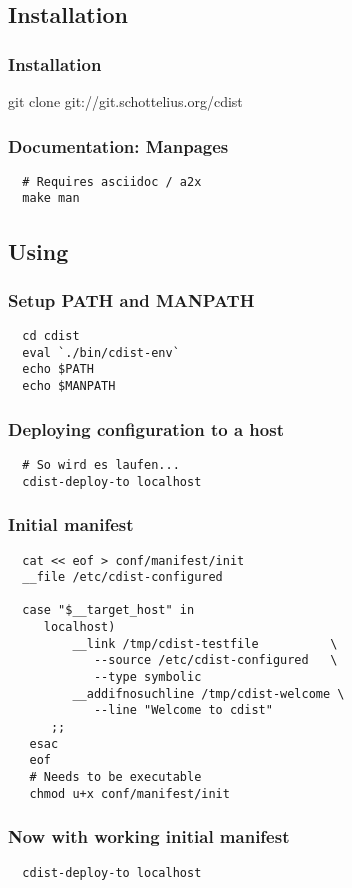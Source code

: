 \documentclass{beamer}
\begin{document}
\subsection{Installation}
\frame
{
  \frametitle{Installation}
  \begin{center}
  git clone git://git.schottelius.org/cdist
  \end{center}
}

\begin{frame}[fragile]
  \frametitle{Documentation: Manpages}

  \begin{verbatim}
  # Requires asciidoc / a2x
  make man
  \end{verbatim}
\end{frame}

\subsection{Using}
\begin{frame}[fragile]
  \frametitle{Setup PATH and MANPATH}

  \begin{verbatim}
  cd cdist
  eval `./bin/cdist-env`
  echo $PATH
  echo $MANPATH
  \end{verbatim}
\end{frame}

\begin{frame}[fragile]
  \frametitle{Deploying configuration to a host}
  \begin{verbatim}
  # So wird es laufen...
  cdist-deploy-to localhost
  \end{verbatim}
\end{frame}
\begin{frame}[fragile]
  \frametitle{Initial manifest}
  \begin{small}
  \begin{verbatim}
  cat << eof > conf/manifest/init
  __file /etc/cdist-configured

  case "$__target_host" in
     localhost)
         __link /tmp/cdist-testfile          \
            --source /etc/cdist-configured   \ 
            --type symbolic
         __addifnosuchline /tmp/cdist-welcome \
            --line "Welcome to cdist"
      ;;
   esac
   eof
   # Needs to be executable
   chmod u+x conf/manifest/init

  \end{verbatim}
  \end{small}
\end{frame}
\begin{frame}[fragile]
  \frametitle{Now with working initial manifest}
  \begin{verbatim}
  cdist-deploy-to localhost
  \end{verbatim}
\end{frame}
\end{document}
